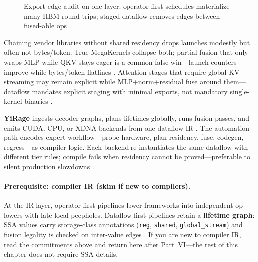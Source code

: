 \begin{figure}[t]
\centering
{}
\caption{Export-edge audit on one layer: operator-first schedules materialize many HBM round trips; staged dataflow removes edges between fused-able ops \citep{memoryfloor2026}.}
\label{fig:export_edges}
\end{figure}

Chaining vendor libraries without shared residency drops launches modestly but often not bytes/token.
True MegaKernels collapse both; partial fusion that only wraps MLP while QKV stays eager is a common false win---launch counters improve while bytes/token flatlines \citep{taxbreak2026}.
Attention stages that require global KV streaming may remain explicit while MLP+norm+residual fuse around them---dataflow mandates explicit staging with minimal exports, not mandatory single-kernel binaries \citep{dao2022flashattention,dao2023flashdecoding}.

\textbf{YiRage} ingests decoder graphs, plans lifetimes globally, runs fusion passes, and emits CUDA, CPU, or XDNA backends from one dataflow IR \citep{yirage2026,chen2020compilerbasedhardw}.
The automation path encodes expert workflow---probe hardware, plan residency, fuse, codegen, regress---as compiler logic.
Each backend re-instantiates the same dataflow with different tier rules; compile fails when residency cannot be proved---preferable to silent production slowdowns \citep{yirage2026}.

\paragraph{Prerequisite: compiler IR (skim if new to compilers).}
At the IR layer, operator-first pipelines lower frameworks into independent op lowers with late local peepholes.
Dataflow-first pipelines retain a \textbf{lifetime graph}: SSA values carry storage-class annotations (\texttt{reg}, \texttt{shared}, \texttt{global\_stream}) and fusion legality is checked on inter-value edges \citep{chen2020compilerbasedhardw}.
If you are new to compiler IR, read the commitments above and return here after Part~VI---the rest of this chapter does not require SSA details.

